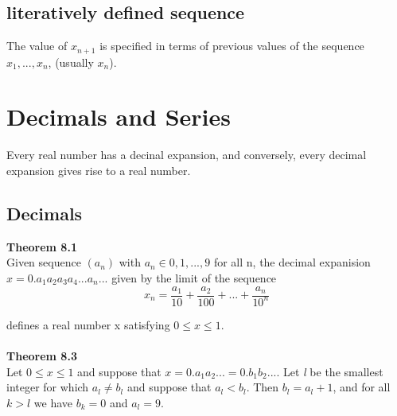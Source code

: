 \documentclass{article}
\theoremstyle{definition}
\theoremstyle{definition}
\theoremstyle{remark}
\begin{document}
\subsection{literatively defined sequence}
The value of $x_{n+1}$ is specified in terms of previous values of the sequence $x_{1}, ..., x_{n}$, (usually $x_{n}$).
\pagebreak


\section{Decimals and Series}
Every real number has a decinal expansion, and conversely, every decimal expansion gives rise to a real number.

\subsection{Decimals}
\textbf{Theorem 8.1}\\
Given sequence $(a_{n})$ with $a_{n} \in {0,1,...,9}$ for all n, the decimal expanision $x=0.a_{1}a_{2}a_{3}a_{4}...a_{n}...$ given by the limit of the sequence \\

\begin{equation}
    x_{n}=\frac{a_{1}}{10}+\frac{{a}_{2}}{100}+...+\frac{{a}_{n}}{10^{n}}
\end{equation}


defines a real number x satisfying $0 \leq x \leq 1$.\\
\\
\textbf{Theorem 8.3}\\
Let $0\leq x \leq 1$ and suppose that $x=0.{a}_{1}{a}_{2}... = 0.{b}_{1}{b}_{2}...$. Let \textit{l} be the smallest integer for which ${a}_{\textit{l}} \neq {b}_{\textit{l}}$ and suppose that ${a}_{\textit{l}} < {b}_{\textit{l}}$.
Then ${b}_{\textit{l}} = {a}_{\textit{l}}+1$, and for all $k > \textit{l}$ we have ${b}_{\textit{k}}=0$ and ${a}_{\textit{l}}=9$.
\end{document}
